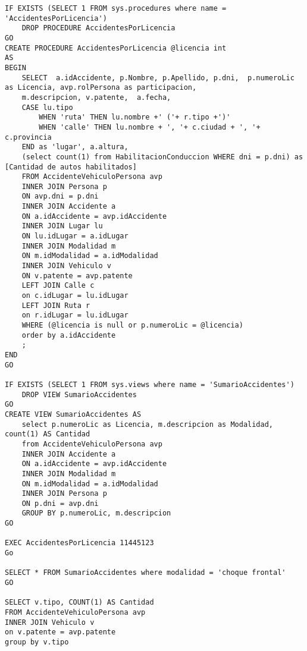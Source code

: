 {\begin{verbatim}
IF EXISTS (SELECT 1 FROM sys.procedures where name = 'AccidentesPorLicencia')
    DROP PROCEDURE AccidentesPorLicencia
GO
CREATE PROCEDURE AccidentesPorLicencia @licencia int
AS
BEGIN
    SELECT  a.idAccidente, p.Nombre, p.Apellido, p.dni,  p.numeroLic as Licencia, avp.rolPersona as participacion, 
    m.descripcion, v.patente,  a.fecha, 
	CASE lu.tipo 
		WHEN 'ruta' THEN lu.nombre +' ('+ r.tipo +')'
		WHEN 'calle' THEN lu.nombre + ', '+ c.ciudad + ', '+ c.provincia
	END as 'lugar', a.altura,
	(select count(1) from HabilitacionConduccion WHERE dni = p.dni) as [Cantidad de autos habilitados]
    FROM AccidenteVehiculoPersona avp 
    INNER JOIN Persona p
    ON avp.dni = p.dni
    INNER JOIN Accidente a
    ON a.idAccidente = avp.idAccidente
    INNER JOIN Lugar lu
    ON lu.idLugar = a.idLugar
    INNER JOIN Modalidad m
    ON m.idModalidad = a.idModalidad
    INNER JOIN Vehiculo v
	ON v.patente = avp.patente
    LEFT JOIN Calle c
	on c.idLugar = lu.idLugar
	LEFT JOIN Ruta r
	on r.idLugar = lu.idLugar
	WHERE (@licencia is null or p.numeroLic = @licencia)
    order by a.idAccidente
    ;
END
GO

IF EXISTS (SELECT 1 FROM sys.views where name = 'SumarioAccidentes')
    DROP VIEW SumarioAccidentes
GO
CREATE VIEW SumarioAccidentes AS
    select p.numeroLic as Licencia, m.descripcion as Modalidad, count(1) AS Cantidad
    from AccidenteVehiculoPersona avp
    INNER JOIN Accidente a
    ON a.idAccidente = avp.idAccidente
    INNER JOIN Modalidad m
    ON m.idModalidad = a.idModalidad
    INNER JOIN Persona p
    ON p.dni = avp.dni
    GROUP BY p.numeroLic, m.descripcion
GO

EXEC AccidentesPorLicencia 11445123
Go

SELECT * FROM SumarioAccidentes where modalidad = 'choque frontal'
GO

SELECT v.tipo, COUNT(1) AS Cantidad
FROM AccidenteVehiculoPersona avp
INNER JOIN Vehiculo v
on v.patente = avp.patente
group by v.tipo

\end{verbatim}
}
